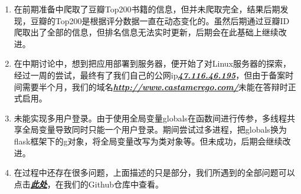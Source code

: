 \documentclass[twoside,11pt]{article}
\begin{document}
\begin{enumerate}
    \item 在前期准备中爬取了豆瓣Top200书籍的信息，但并未爬取完全，结果后期发现，豆瓣的Top200是根据评分数据一直在动态变化的。虽然后期通过豆瓣ID爬取出了全部的信息，但排名信息无法实时更新，后期会在此基础上继续改进。
    \item 在中期讨论中，想到把应用部署到服务器，便开始了对Linux服务器的探索，经过一周的尝试，最终有了我们自己的公网ip\href{http://47.116.46.195/}{\textbf{\emph{47.116.46.195}}}，但由于备案时间需要半个月，我们的域名\href{http://www.castamerego.com/}{\textbf{\emph{http://www.castamerego.com/}}}未能在答辩时正式启用。
    \item 未能实现多用户登录。由于使用全局变量globals在函数间进行传参，多线程共享全局变量导致同时只能一个用户登录。期间尝试过多进程，把globals换为flask框架下的g对象，将全局变量改写为类对象等。但未成功，后期会继续改进。
    \item 在过程中还存在很多问题，上面描述的只是部分，我们所遇到的全部问题可以点击\href{https://github.com/Casta-mere/Read-Book/tree/main/record/bugs}{\textbf{\emph{此处}}}，在我们的Github仓库中查看。
\end{enumerate}


\end{document}
